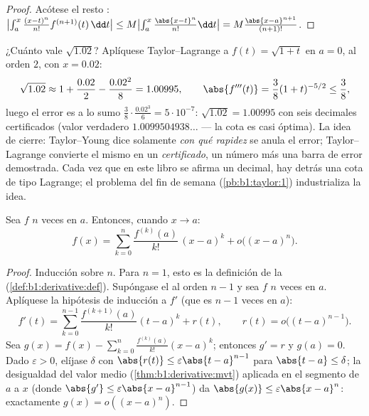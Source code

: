 \begin{proof}
Acótese el resto : $\bigl|\int_a^x \frac{(x-t)^n}{n!}
f^{(n+1)}(t)\,\dd t\bigr| \leq M \bigl|\int_a^x
\frac{\abs{x-t}^n}{n!}\dd t\bigr| = M\frac{\abs{x-a}^{n+1}}{(n+1)!}$.
\end{proof}

\begin{example}\label{ex:b1:taylor:certified}
¿Cuánto vale $\sqrt{1.02}$? Aplíquese Taylor--Lagrange a
$f(t) = \sqrt{1 + t}$ en $a = 0$, al orden $2$, con $x = 0.02$:
\[
\sqrt{1.02} \approx 1 + \frac{0.02}{2} - \frac{0.02^2}{8}
= 1.00995 ,
\qquad
\abs{f'''(t)} = \frac{3}{8}(1+t)^{-5/2} \leq \frac 38 ,
\]
luego el error es a lo sumo
$\frac38 \cdot \frac{0.02^3}{6} = 5\cdot10^{-7}$:
$\sqrt{1.02} = 1.00995$ con seis decimales certificados (valor
verdadero $1.0099504938\dots$ --- la cota es casi óptima). La idea de
cierre: Taylor--Young dice solamente \emph{con qué rapidez} se anula
el error; Taylor--Lagrange convierte el mismo  en un
\emph{certificado}, un número más una barra de error demostrada. Cada
vez que en este libro se afirma un decimal, hay detrás una cota de
tipo Lagrange; el problema del fin de semana
(\cref{pb:b1:taylor:1}) industrializa la idea.
\end{example}

\begin{theorem}\label{thm:b1:taylor:young}
Sea $f$ $n$ veces  en $a$. Entonces, cuando $x \to a$:
\[
f(x) = \sum_{k=0}^{n} \frac{f^{(k)}(a)}{k!}\,(x-a)^k
+ o\bigl((x-a)^n\bigr) .
\]
\end{theorem}

\begin{proof}
Inducción sobre $n$. Para $n = 1$, esto es la definición de la
 (\cref{def:b1:derivative:def}). Supóngase el  al
orden $n - 1$ y sea $f$ $n$ veces  en $a$. Aplíquese la
hipótesis de inducción a $f'$ (que es $n-1$ veces  en $a$):
\[
f'(t) = \sum_{k=0}^{n-1} \frac{f^{(k+1)}(a)}{k!}(t-a)^k + r(t),
\qquad r(t) = o\bigl((t-a)^{n-1}\bigr).
\]
Sea $g(x) = f(x) - \sum_{k=0}^{n} \frac{f^{(k)}(a)}{k!}(x-a)^k$;
entonces $g' = r$ y $g(a) = 0$. Dado $\varepsilon > 0$, elíjase
$\delta$ con $\abs{r(t)} \leq \varepsilon\abs{t - a}^{n-1}$ para
$\abs{t-a} \leq \delta$; la desigualdad del valor medio
(\cref{thm:b1:derivative:mvt}) aplicada en el segmento de $a$ a $x$
(donde $\abs{g'} \leq \varepsilon\abs{x-a}^{n-1}$) da
$\abs{g(x)} \leq \varepsilon\abs{x - a}^n$: exactamente
$g(x) = o((x-a)^n)$.
\end{proof}

